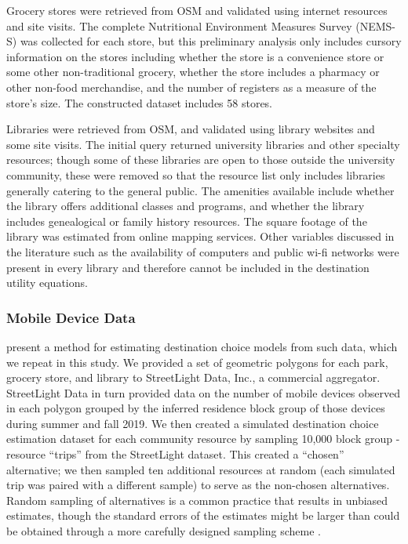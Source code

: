 \documentclass[ijerph,article,submit,moreauthors,pdftex]{mdpi}
\begin{document}
Grocery stores were retrieved from OSM and validated using internet resources and
site visits. The complete Nutritional Environment Measures Survey (NEMS-S) \citep{glanz2007}
was collected for each store, but this preliminary analysis only includes
cursory information on the stores including whether the store is a convenience store
or some other non-traditional grocery, whether the store includes a pharmacy or
other non-food merchandise, and the number of registers as a measure of the
store's size. The constructed dataset includes 58 stores.

Libraries were retrieved from OSM, and validated using library websites and
some site visits. The initial query returned university libraries and other
specialty resources; though some of these libraries are open to those outside
the university community, these were removed so that the resource list only
includes libraries generally catering to the general public. The amenities
available include whether the library offers additional classes and programs,
and whether the library includes genealogical or family history resources. The
square footage of the library was estimated from online mapping services.
Other variables discussed in the literature such as the availability of computers
and public wi-fi networks were present in every library and therefore cannot
be included in the destination utility equations.

\hypertarget{mobile-device-data}{%
\subsubsection{Mobile Device Data}\label{mobile-device-data}}

\citet{alamedaparks} present a method for estimating destination choice models from
such data, which we repeat in this study. We provided a set of geometric
polygons for each park, grocery store, and library to StreetLight Data, Inc., a
commercial aggregator. StreetLight Data in turn provided data on the number of
mobile devices observed in each polygon grouped by the inferred residence block
group of those devices during summer and fall 2019.
We then created a simulated destination choice estimation dataset for each
community resource by sampling 10,000 block group - resource ``trips'' from the
StreetLight dataset. This created a ``chosen'' alternative; we then sampled ten additional
resources at random (each simulated trip was paired with a different sample) to
serve as the non-chosen alternatives. Random sampling of alternatives is a
common practice that results in unbiased estimates, though the standard errors
of the estimates might be larger than could be obtained through a more carefully
designed sampling scheme \citep{train2009}.
\end{document}
